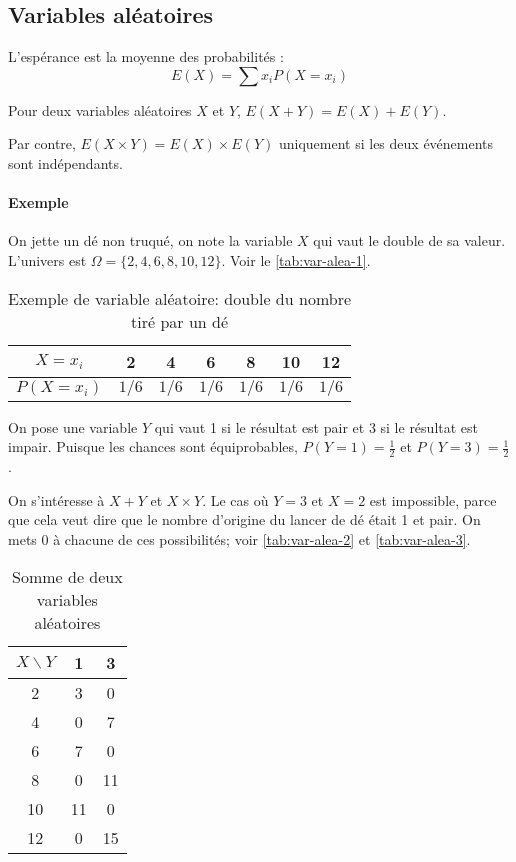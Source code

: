 \documentclass[10pt,a4paper,french]{article}
\begin{document}
\subsection{Variables aléatoires}

L'espérance est la moyenne des probabilités : \[ E(X) = \sum x_i P(X=x_i) \]

Pour deux variables aléatoires $X$ et $Y$, $E(X+Y) = E(X) + E(Y)$.

Par contre, $E(X \times Y) = E(X) \times E(Y)$ uniquement si les deux événements sont indépendants.

\paragraph{Exemple}

On jette un dé non truqué, on note la variable $X$ qui vaut le double de sa valeur. L'univers est $\Omega=\lbrace 2, 4, 6, 8, 10, 12 \rbrace$. Voir le \autoref{tab:var-alea-1}.

\begin{table}[h]
\caption{\label{tab:var-alea-1} Exemple de variable aléatoire: double du nombre tiré par un dé}
\centering
\begin{tabular}{c|cccccc}
$X=x_i$ & 2 & 4 & 6 & 8 & 10 & 12\\
\hline
$P(X=x_i)$ & $1/6$ & $1/6$ & $1/6$ & $1/6$ & $1/6$ & $1/6$\\
\end{tabular}
\end{table}

On pose une variable $Y$ qui vaut 1 si le résultat est pair et 3 si le résultat est impair. Puisque les chances sont équiprobables, $P(Y=1) = \frac{1}{2}$ et $P(Y=3) = \frac{1}{2}$.

On s'intéresse à $X+Y$ et $X \times Y$. Le cas où $Y=3$ et $X=2$ est impossible, parce que cela veut dire que le nombre d'origine du lancer de dé était 1 et pair. On mets 0 à chacune de ces possibilités; voir \autoref{tab:var-alea-2} et \autoref{tab:var-alea-3}.

\begin{table}[h]
\caption{\label{tab:var-alea-2} Somme de deux variables aléatoires}
\centering
\begin{tabular}{c|cc}
$X \backslash Y$ & 1 & 3\\
\hline
2 & 3 & 0\\
4 & 0 & 7\\
6 & 7 & 0\\
8 & 0 & 11\\
10 & 11 & 0\\
12 & 0 & 15\\
\end{tabular}
\end{table}
\end{document}
